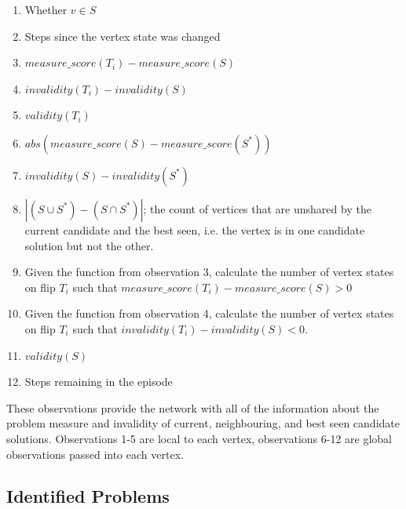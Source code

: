 \documentclass{article}
\begin{document}
\begin{enumerate}
    \item Whether $v \in S$
    \item Steps since the vertex state was changed
    \item $measure\_score(T_i) - measure\_score(S)$
    \item $invalidity(T_i) - invalidity(S)$
    \item $validity(T_i)$
    \item $abs(measure\_score(S) - measure\_score(S^*))$
    \item $invalidity(S) - invalidity(S^*)$
    \item $|(S \cup S^*) - (S \cap S^*)|$; the count of vertices that are unshared by the current candidate and the best seen, i.e. the vertex is in one candidate solution but not the other.
    \item Given the function from observation 3, calculate the number of vertex states on flip $T_i$ such that $measure\_score(T_i) - measure\_score(S) > 0$
    \item Given the function from observation 4, calculate the number of vertex states on flip $T_i$ such that $invalidity(T_i) - invalidity(S) < 0$. 
    \item $validity(S)$
    \item Steps remaining in the episode
\end{enumerate}

These observations provide the network with all of the information about the problem measure and invalidity of current, neighbouring, and best seen candidate solutions. Observations 1-5 are local to each vertex, observations 6-12 are global observations passed into each vertex.

\subsection{Identified Problems}\label{sec:single-subset-problems}
\end{document}

